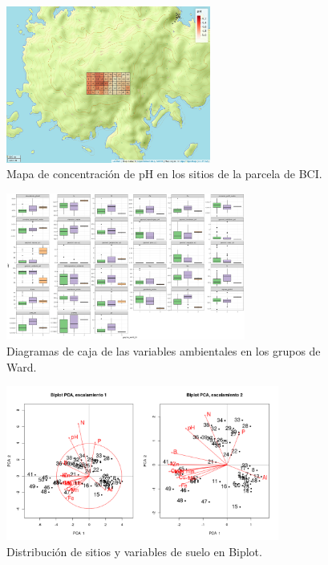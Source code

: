 \documentclass[11pt,]{article}
\begin{document}
\begin{figure}
\centering
\includegraphics[width=0.60000\textwidth]{mapa_ph.png}
\caption{Mapa de concentración de pH en los sitios de la parcela de
BCI.\label{fig:ph}}
\end{figure}

\begin{figure}
\centering
\includegraphics[width=0.70000\textwidth]{ward_caja.png}
\caption{Diagramas de caja de las variables ambientales en los grupos de
Ward.\label{fig:ward_caja}}
\end{figure}

\begin{figure}
\centering
\includegraphics[width=0.80000\textwidth]{escalamiento_ward.png}
\caption{Distribución de sitios y variables de suelo en
Biplot.\label{fig:escalamientobi}}
\end{figure}
\end{document}
